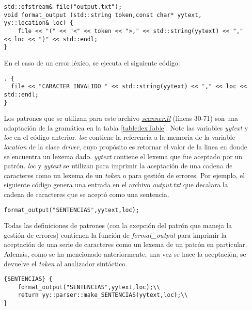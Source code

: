\begin{lstlisting}
std::ofstream& file("output.txt");
void format_output (std::string token,const char* yytext, yy::location& loc) {
    file << "(" << "<" << token << ">," << std::string(yytext) << "," << loc << ")" << std::endl;
}
\end{lstlisting}
En el caso de un error léxico, se ejecuta el siguiente código:
\begin{lstlisting}
. {
  file << "CARACTER INVALIDO " << std::string(yytext) << "," << loc << std::endl;
}
\end{lstlisting}
Los patrones que se utilizan para este archivo \href{https://github.com/aramis-matos/comp4999_compilers_project/blob/master/code/scanner.ll}{\textit{scanner.ll}} (líneas 30-71) son una adaptación de la gramática en la tabla \ref{table:lexTable}. Note las variables \textit{yytext} y \textit{loc} en el código anterior. 
\textit{loc} contiene la referencia a la memoria de la variable \textit{location} de la clase \textit{driver}, cuyo propósito es retornar el valor de la linea en donde se encuentra un lexema dado.
\textit{yytext} contiene el lexema que fue aceptado por un patrón.
\textit{loc} y \textit{yytext} se utilizan para imprimir la aceptación de una cadena de caracteres como un lexema de un \textit{token} o para gestión de errores. Por ejemplo, el siguiente código genera una entrada en el archivo \href{https://github.com/aramis-matos/comp4999_compilers_project/blob/master/code/output.txt}{\textit{output.txt}} que decalara la cadena de caracteres que se aceptó como una sentencia.
\begin{lstlisting}
format_output("SENTENCIAS",yytext,loc);
\end{lstlisting}

Todas las definiciones de patrones (con la exepción del patrón que maneja la gestión de errores) contienen la función de \textit{format\_output} para imprimir la aceptación de una serie de caracteres como un lexema de un patrón en particular.
Además, como se ha mencionado anteriormente, una vez se hace la aceptación, se devuelve el \textit{token} al analizador sintáctico.

\begin{lstlisting}
{SENTENCIAS} {
    format_output("SENTENCIAS",yytext,loc);\\
    return yy::parser::make_SENTENCIAS(yytext,loc);\\
}
\end{lstlisting}


